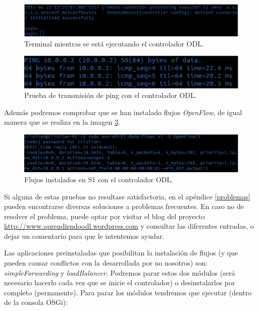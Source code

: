 \documentclass[a4paper,11pt]{book}
\begin{document}
\begin{figure}[tb]
\centering
\includegraphics[scale=0.5]{./figuras/prueba1}
\caption{Terminal mientras se está ejecutando el controlador \ac{ODL}.}\label{algo}
\end{figure}

\begin{figure}[tb]
\centering
\includegraphics[scale=0.5]{./figuras/prueba2}
\caption{Prueba de transmisión de ping con el controlador \ac{ODL}.}\label{correctPing}
\end{figure}

Además podremos comprobar que se han instalado flujos \emph{OpenFlow}, de igual manera que se realiza en la imagen \ref{correctFlows}.

\begin{figure}[tb]
\centering
\includegraphics[scale=0.5]{./figuras/prueba3}
\caption{Flujos instalados en S1 con el controlador \ac{ODL}.}\label{correctFlows}
\end{figure}

Si alguna de estas pruebas no resultase satisfactoria, en el apéndice \ref{problemas} pueden encontrarse diversas soluciones a problemas frecuentes. En caso no de resolver el problema, puede optar por visitar el blog del proyecto \url{http://www.aprendiendoodl.wordpress.com} y consultar las diferentes entradas, o dejar un comentario para que le intentemos ayudar.

Las aplicaciones preinstaladas que posibilitan la instalación de flujos (y que pueden causar conflictos con la desarrollada por no nosotros) son: \textit{simpleForwarding} y \textit{loadBalancer}. Podremos parar estos dos módulos (será necesario hacerlo cada vez que se inicie el controlador) o desinstalarlos por completo (permanente). Para parar los módulos tendremos que ejecutar (dentro de la consola OSGi):
\end{document}
